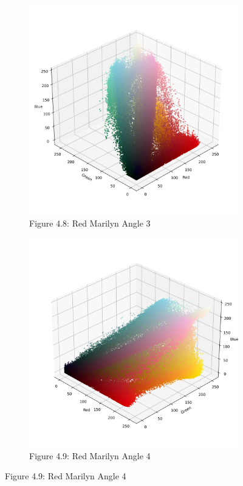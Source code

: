 \documentclass{article}
\begin{document}
\begin{figure}[ht]
  \vspace{1em}
  
  \begin{subfigure}{0.45\textwidth}
    \centering
    \includegraphics[width=\textwidth]{main_files/figure-latex/4_7_red_marilyn_original_scatter.jpg}
    \caption{Figure 4.8: Red Marilyn Angle 3}
    \label{fig:4_8_red_marilyn_original_scatter}
  \end{subfigure}
  \hfill
  \begin{subfigure}{0.45\textwidth}
    \centering
    \includegraphics[width=\textwidth]{main_files/figure-latex/4_8_red_marilyn_original_scatter.jpg}
    \caption{Figure 4.9: Red Marilyn Angle 4}
    \label{fig:4_9_red_marilyn_original_scatter}
  \end{subfigure}
  

\end{figure}
\end{document}
